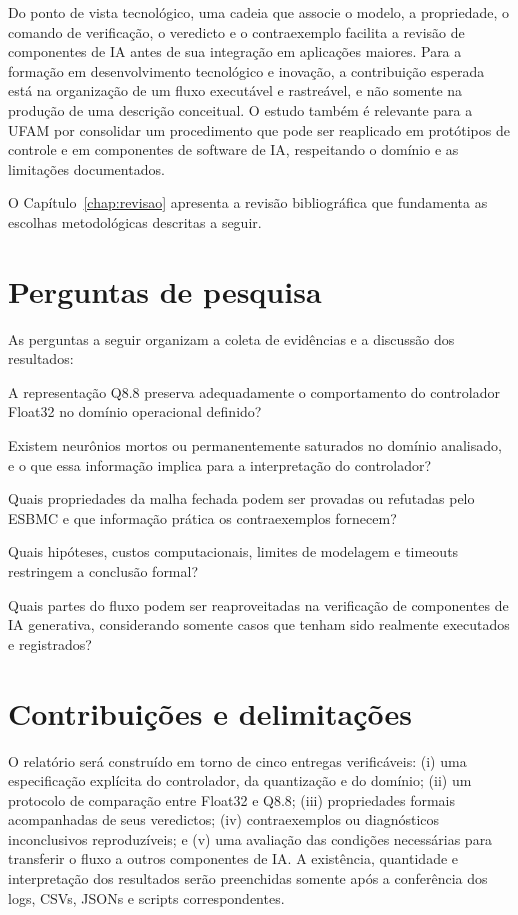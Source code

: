 Do ponto de vista tecnológico, uma cadeia que associe o modelo, a propriedade, o comando de verificação, o veredicto e o contraexemplo facilita a revisão de componentes de IA antes de sua integração em aplicações maiores. Para a formação em desenvolvimento tecnológico e inovação, a contribuição esperada está na organização de um fluxo executável e rastreável, e não somente na produção de uma descrição conceitual. O estudo também é relevante para a UFAM por consolidar um procedimento que pode ser reaplicado em protótipos de controle e em componentes de software de IA, respeitando o domínio e as limitações documentados.

O Capítulo~\ref{chap:revisao} apresenta a revisão bibliográfica que fundamenta as
escolhas metodológicas descritas a seguir.

\section{Perguntas de pesquisa}
As perguntas a seguir organizam a coleta de evidências e a discussão dos resultados:

\begin{description}[leftmargin=2.4cm,style=nextline]
  \item[PQ1 -- Fidelidade.] A representação Q8.8 preserva adequadamente o comportamento do controlador Float32 no domínio operacional definido?
  \item[PQ2 -- Estrutura neural.] Existem neurônios mortos ou permanentemente saturados no domínio analisado, e o que essa informação implica para a interpretação do controlador?
  \item[PQ3 -- Segurança.] Quais propriedades da malha fechada podem ser provadas ou refutadas pelo ESBMC e que informação prática os contraexemplos fornecem?
  \item[PQ4 -- Limites.] Quais hipóteses, custos computacionais, limites de modelagem e timeouts restringem a conclusão formal?
  \item[PQ5 -- Generalização metodológica.] Quais partes do fluxo podem ser reaproveitadas na verificação de componentes de IA generativa, considerando somente casos que tenham sido realmente executados e registrados?
\end{description}

\section{Contribuições e delimitações}
O relatório será construído em torno de cinco entregas verificáveis: (i) uma especificação explícita do controlador, da quantização e do domínio; (ii) um protocolo de comparação entre Float32 e Q8.8; (iii) propriedades formais acompanhadas de seus veredictos; (iv) contraexemplos ou diagnósticos inconclusivos reproduzíveis; e (v) uma avaliação das condições necessárias para transferir o fluxo a outros componentes de IA. A existência, quantidade e interpretação dos resultados serão preenchidas somente após a conferência dos logs, CSVs, JSONs e scripts correspondentes.

